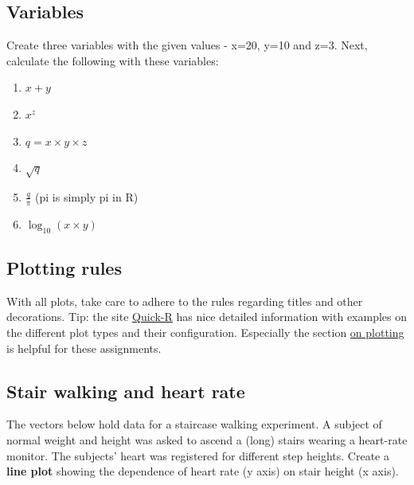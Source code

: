 \documentclass[]{book}
\providecommand{\tightlist}{%
  \setlength{\itemsep}{0pt}\setlength{\parskip}{0pt}}
\begin{document}
\hypertarget{variables-1}{%
\subsection{Variables}\label{variables-1}}

Create three variables with the given values - x=20, y=10 and z=3. Next, calculate the following with these variables:

\begin{enumerate}
\def\labelenumi{\arabic{enumi}.}
\tightlist
\item
  \(x+y\)
\item
  \(x^z\)
\item
  \(q = x \times y \times z\)
\item
  \(\sqrt{q}\)
\item
  \(\frac{q}{\pi}\) (pi is simply pi in R)
\item
  \(\log_{10}{(x \times y)}\)
\end{enumerate}

\hypertarget{plotting-rules}{%
\subsection*{Plotting rules}\label{plotting-rules}}

With all plots, take care to adhere to the rules regarding titles and other decorations. Tip: the site \href{http://www.statmethods.net/}{Quick-R} has nice detailed information with examples on the different plot types and their configuration. Especially the section \href{http://www.statmethods.net/graphs/index.html}{on plotting} is helpful for these assignments.

\hypertarget{stair-walking-and-heart-rate}{%
\subsection{Stair walking and heart rate}\label{stair-walking-and-heart-rate}}

The vectors below hold data for a staircase walking experiment. A subject of normal weight and height was asked to ascend a (long) stairs wearing a heart-rate monitor. The subjects' heart was registered for different step heights. Create a \textbf{line plot} showing the dependence of heart rate (y axis) on stair height (x axis).
\end{document}
